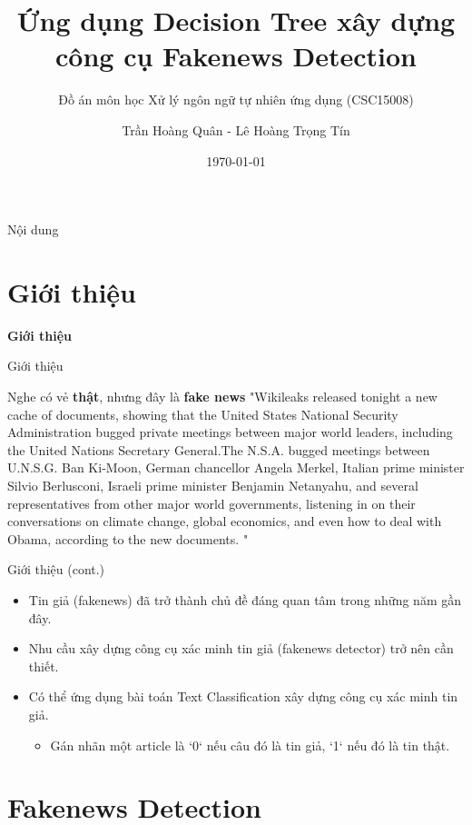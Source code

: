 \documentclass[aspectratio=169,xcolor=dvipsnames]{beamer}
\title[Fakenews Detection]{Ứng dụng Decision Tree xây dựng \\ công cụ Fakenews Detection}
\subtitle{Đồ án môn học Xử lý ngôn ngữ tự nhiên ứng dụng (CSC15008)}
\author[Quan-Tran] {Trần Hoàng Quân - Lê Hoàng Trọng Tín}
\institute[HCMUS]
{
    Khoa Công nghệ thông tin \\
    Trường Đại học Khoa học Tự nhiên - ĐHQG HCM
}
\date{\today}
\begin{document}
\begin{frame}
    \titlepage
\end{frame}

\begin{frame}{Nội dung}
    \tableofcontents
\end{frame}

\section{Giới thiệu}

\begin{frame}
	\Huge{\centerline{\textbf{Giới thiệu}}}
\end{frame}


\begin{frame}{Giới thiệu}
\begin{alertblock}{Nghe có vẻ \textbf{thật}, nhưng đây là \textbf{fake news}}
"Wikileaks released tonight a new cache of documents, showing that the United States  National Security Administration bugged private meetings between major world leaders, including the United Nations Secretary General.The N.S.A. bugged meetings between U.N.S.G. Ban Ki-Moon, German chancellor Angela Merkel, Italian prime minister Silvio Berlusconi, Israeli prime minister Benjamin Netanyahu, and several representatives from other major world governments, listening in on their conversations on climate change, global economics, and even  how to deal with Obama,  according to the new documents. "
\end{alertblock}
\end{frame}

\begin{frame}{Giới thiệu (cont.)}
\begin{itemize}
\item Tin giả (fakenews) đã trở thành chủ đề đáng quan tâm trong những năm gần đây.
\item Nhu cầu xây dựng công cụ xác minh tin giả (fakenews detector) trở nên cần thiết.
\item Có thể ứng dụng bài toán Text Classification xây dựng công cụ xác minh tin giả.
\begin{itemize}
    \item Gán nhãn một article là `0` nếu câu đó là tin giả, `1` nếu đó là tin thật.
\end{itemize}
\end{itemize}
\end{frame}

\section{Fakenews Detection}
\end{document}
